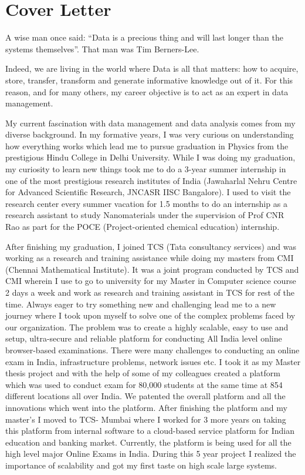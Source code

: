 ﻿
\section*{Cover Letter}
A wise man once said: “Data is a precious thing and will last longer than the systems themselves”. That man was Tim Berners-Lee.

Indeed, we are living in the world where Data is all that matters: how to acquire, store, transfer, transform and generate informative knowledge out of it. For this reason, and for many others, my career objective is to act as an expert in data management.

My current fascination with data management and data analysis comes from my diverse background. In my formative years, I was very curious on understanding how everything works which lead me to pursue graduation in Physics from the prestigious Hindu College in Delhi University. While I was doing my graduation, my curiosity to learn new things took me to do a 3-year summer internship in one of the most prestigious research institutes of India (Jawaharlal Nehru Centre for Advanced Scientific Research, JNCASR IISC Bangalore). I used to visit the research center every summer vacation for 1.5 months to do an internship as a research assistant to study Nanomaterials under the supervision of Prof CNR Rao as part for the POCE (Project-oriented chemical education) internship.

After finishing my graduation, I joined TCS (Tata consultancy services) and was working as a research and training assistance while doing my masters from CMI (Chennai Mathematical Institute). It was a joint program conducted by TCS and CMI wherein I use to go to university for my Master in Computer science course 2 days a week and work as research and training assistant in TCS for rest of the time.
Always eager to try something new and challenging lead me to a new journey where I took upon myself to solve one of the complex problems faced by our organization. The problem was to create a highly scalable, easy to use and setup, ultra-secure and reliable platform for conducting All India level online browser-based examinations. There were many challenges to conducting an online exam in India, infrastructure problems, network issues etc. I took it as my Master thesis project and with the help of some of my colleagues created a platform which was used to conduct exam for 80,000 students at the same time at 854 different locations all over India. We patented the overall platform and all the innovations which went into the platform. After finishing the platform and my master’s I moved to TCS- Mumbai where I worked for 3 more years on taking this platform from internal software to a cloud-based service platform for Indian education and banking market. Currently, the platform is being used for all the high level major Online Exams in India. During this 5 year project I realized the importance of scalability and got my first taste on high scale large systems.


